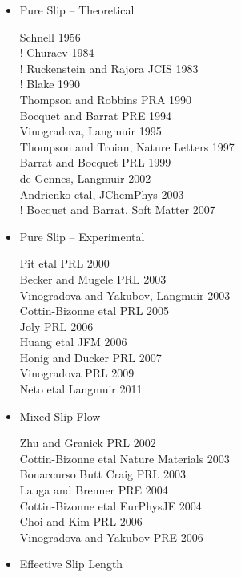 \documentclass[twocolumn]{article}
\begin{document}
\begin{itemize}
\item Pure Slip -- Theoretical

Schnell 1956 \\
! Churaev 1984 \\
! Ruckenstein and Rajora JCIS 1983 \\
! Blake 1990 \\
Thompson and Robbins PRA 1990 \\
Bocquet and Barrat PRE 1994 \\
Vinogradova, Langmuir 1995 \\
Thompson and Troian, Nature Letters 1997 \\
Barrat and Bocquet PRL 1999 \\
de Gennes, Langmuir 2002 \\
Andrienko etal, JChemPhys 2003 \\
! Bocquet and Barrat, Soft Matter 2007 \\

\item Pure Slip -- Experimental

Pit etal PRL 2000 \\
Becker and Mugele PRL 2003 \\
Vinogradova and Yakubov, Langmuir 2003 \\
Cottin-Bizonne etal PRL 2005 \\
Joly PRL 2006 \\
Huang etal JFM 2006 \\
Honig and Ducker PRL 2007 \\
Vinogradova PRL 2009 \\
Neto etal Langmuir 2011 \\

\item Mixed Slip Flow

Zhu and Granick PRL 2002 \\
Cottin-Bizonne etal Nature Materials 2003 \\
Bonaccurso Butt Craig PRL 2003 \\
Lauga and Brenner PRE 2004 \\
Cottin-Bizonne etal EurPhysJE 2004 \\
Choi and Kim PRL 2006 \\
Vinogradova and Yakubov PRE 2006 \\


\item Effective Slip Length


\end{itemize}
\end{document}
